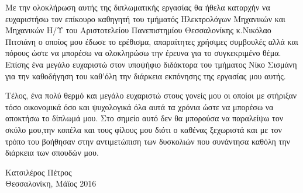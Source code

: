 
\cleardoublepage


\begin{acknowledgements}

\par Με την ολοκλήρωση αυτής της διπλωματικής εργασίας θα ήθελα καταρχήν να ευχαριστήσω τον επίκουρο καθηγητή του τμήματός Ηλεκτρολόγων Μηχανικών και Μηχανικών Η/Υ του Αριστοτελείου Πανεπιστημίου Θεσσαλονίκης κ.Νικόλαο Πιτσιάνη ο οποίος μου έδωσε το ερέθισμα, απαραίτητες χρήσιμες συμβουλές αλλά και πόρους ώστε να μπορέσω να ολοκληρώσω την έρευνα για το συγκεκριμένο θέμα. Επίσης ένα μεγάλο ευχαριστώ στον υποψήφιο διδάκτορα του τμήματος Νίκο Σισμάνη για την καθοδήγηση του καθ'όλη την διάρκεια εκπόνησης της εργασίας μου αυτής. 

\par Τέλος, ένα πολύ θερμό και μεγάλο ευχαριστώ στους γονείς μου οι οποίοι με στήριξαν τόσο οικονομικά όσο και ψυχολογικά όλα αυτά τα χρόνια ώστε να μπορέσω να αποκτήσω το δίπλωμά μου. Στο σημείο αυτό δεν θα μπορούσα να παραλείψω τον σκύλο μου,την κοπέλα και τους φίλους μου διότι ο καθένας ξεχωριστά και με τον τρόπο του βοήθησαν στην αντιμετώπιση των δυσκολιών που συνάντησα καθόλη την διάρκεια των σπουδών μου.

\begin{flushright}
Κατσιλέρος Πέτρος \\
Θεσσαλονίκη, Μάϊος 2016
\end{flushright}

\end{acknowledgements}
